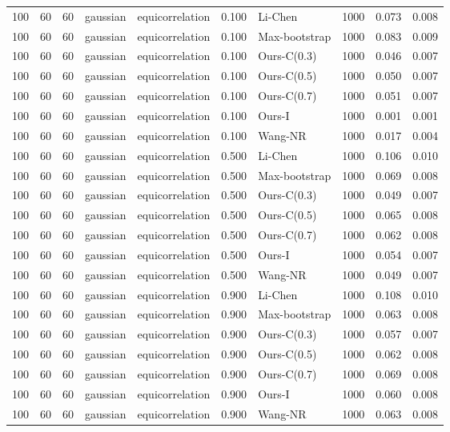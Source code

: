 \begin{tabular}{rrrllrlrrr}
100 & 60 & 60 & gaussian & equicorrelation & 0.100 & Li-Chen & 1000 & 0.073 & 0.008 \\
100 & 60 & 60 & gaussian & equicorrelation & 0.100 & Max-bootstrap & 1000 & 0.083 & 0.009 \\
100 & 60 & 60 & gaussian & equicorrelation & 0.100 & Ours-C(0.3) & 1000 & 0.046 & 0.007 \\
100 & 60 & 60 & gaussian & equicorrelation & 0.100 & Ours-C(0.5) & 1000 & 0.050 & 0.007 \\
100 & 60 & 60 & gaussian & equicorrelation & 0.100 & Ours-C(0.7) & 1000 & 0.051 & 0.007 \\
100 & 60 & 60 & gaussian & equicorrelation & 0.100 & Ours-I & 1000 & 0.001 & 0.001 \\
100 & 60 & 60 & gaussian & equicorrelation & 0.100 & Wang-NR & 1000 & 0.017 & 0.004 \\
100 & 60 & 60 & gaussian & equicorrelation & 0.500 & Li-Chen & 1000 & 0.106 & 0.010 \\
100 & 60 & 60 & gaussian & equicorrelation & 0.500 & Max-bootstrap & 1000 & 0.069 & 0.008 \\
100 & 60 & 60 & gaussian & equicorrelation & 0.500 & Ours-C(0.3) & 1000 & 0.049 & 0.007 \\
100 & 60 & 60 & gaussian & equicorrelation & 0.500 & Ours-C(0.5) & 1000 & 0.065 & 0.008 \\
100 & 60 & 60 & gaussian & equicorrelation & 0.500 & Ours-C(0.7) & 1000 & 0.062 & 0.008 \\
100 & 60 & 60 & gaussian & equicorrelation & 0.500 & Ours-I & 1000 & 0.054 & 0.007 \\
100 & 60 & 60 & gaussian & equicorrelation & 0.500 & Wang-NR & 1000 & 0.049 & 0.007 \\
100 & 60 & 60 & gaussian & equicorrelation & 0.900 & Li-Chen & 1000 & 0.108 & 0.010 \\
100 & 60 & 60 & gaussian & equicorrelation & 0.900 & Max-bootstrap & 1000 & 0.063 & 0.008 \\
100 & 60 & 60 & gaussian & equicorrelation & 0.900 & Ours-C(0.3) & 1000 & 0.057 & 0.007 \\
100 & 60 & 60 & gaussian & equicorrelation & 0.900 & Ours-C(0.5) & 1000 & 0.062 & 0.008 \\
100 & 60 & 60 & gaussian & equicorrelation & 0.900 & Ours-C(0.7) & 1000 & 0.069 & 0.008 \\
100 & 60 & 60 & gaussian & equicorrelation & 0.900 & Ours-I & 1000 & 0.060 & 0.008 \\
100 & 60 & 60 & gaussian & equicorrelation & 0.900 & Wang-NR & 1000 & 0.063 & 0.008 \\

\end{tabular}
